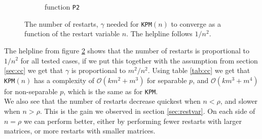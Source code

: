 \begin{figure}[H]
\begin{subfigure}[b]{0.45\textwidth}
                \caption{function \texttt{P2}}
                \label{fig:ant2}
        \end{subfigure}
        \caption{The number of restarts, $\gamma$ needed for \texttt{KPM}$(n)$ to converge as a function of the restart variable $n$. The helpline follows $1/n^2$.}\label{fig:ant}
\end{figure}

The helpline from figure \ref{fig:ant} shows that the number of restarts is proportional to $1/n^2$ for all tested cases, if we put this together with the assumption from section \ref{sec:cc} we get that $\gamma$ is proportional to  $m^2/n^2$. Using table \ref{tab:cc} we get that \texttt{KPM}$(n)$ has a complexity of $\mathcal{O}(km^2 + m^3)$ for separable $p$, and $\mathcal{O}(km^3 + m^4)$ for non-separable $p$, which is the same as for \texttt{KPM}.\\

We also see that the number of restarts decrease quickest when $n < \rho $, and slower when $n > \rho$. This is the gain we observed in section \ref{sec:restvar}. On each side of $n = \rho$ we can perform better, either by performing fewer restarts with larger matrices, or more restarts with smaller matrices. \\
